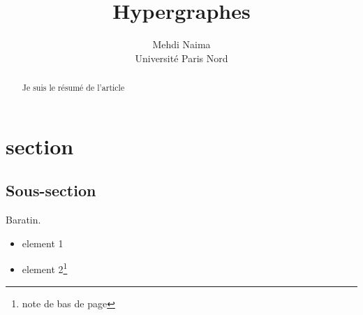 \documentclass[a4paper,11pt]{article}
\author{Mehdi Naima\\ Université Paris Nord}
\title{Hypergraphes}
\begin{document}
\maketitle


\begin{abstract}

Je suis le résumé de l'article


\end{abstract}

\newpage

\tableofcontents
\newpage
\listoffigures
\listoftables
\newpage

 


\section{section}

\subsection{Sous-section}

Baratin.

\begin{itemize}
\item
element 1
\item
element 2\footnote{note de bas de page}
\end{itemize}
\end{document}
